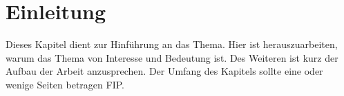 \chapter{Einleitung}
\label{kap:einleitung}

Dieses Kapitel dient zur Hinführung an das Thema. Hier ist herauszuarbeiten, warum das
Thema von Interesse und Bedeutung ist. Des Weiteren ist kurz der Aufbau der Arbeit
anzusprechen. Der Umfang des Kapitels sollte eine oder wenige Seiten betragen \gls{FIP}.